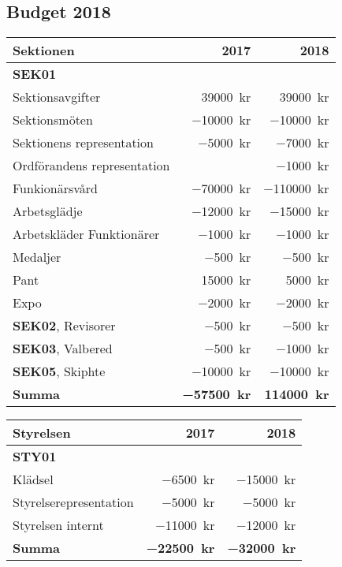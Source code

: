\documentclass[../_main/handlingar.tex]{subfiles}
\begin{document}
\subsection*{Budget 2018}
\begin{tabularx}{10cm}{X r r}
    \textbf{\large Sektionen} & \textbf{2017} & \textbf{2018} \\
    \hline
    \textbf{SEK01} \\
    Sektionsavgifter & \SI{39000}{kr} & \SI{39000}{kr} \\
    Sektionsmöten & \SI{-10000}{kr} & \SI{-10000}{kr} \\
    Sektionens representation & \SI{-5000}{kr} & \SI{-7000}{kr} \\
    Ordförandens representation & & \SI{-1000}{kr} \\
    Funkionärsvård & \SI{-70000}{kr} & \SI{-110000}{kr} \\
    Arbetsglädje & \SI{-12000}{kr} & \SI{-15000}{kr} \\
    Arbetskläder Funktionärer & \SI{-1000}{kr} & \SI{-1000}{kr} \\
    Medaljer & \SI{-500}{kr} & \SI{-500}{kr} \\
    Pant & \SI{15000}{kr} & \SI{5000}{kr} \\
    Expo & \SI{-2000}{kr} & \SI{-2000}{kr} \\
    \textbf{SEK02}, Revisorer & \SI{-500}{kr} & \SI{-500}{kr} \\
    \textbf{SEK03}, Valbered & \SI{-500}{kr} & \SI{-1000}{kr} \\
    \textbf{SEK05}, Skiphte & \SI{-10000}{kr} & \SI{-10000}{kr} \\
    \hline
    \textbf{Summa} & \textbf{\SI{-57500}{kr}} & \textbf{\SI{114000}{kr}} \\
\end{tabularx}

\begin{tabularx}{10cm}{X r r}
    \textbf{\large Styrelsen} & \textbf{2017} & \textbf{2018} \\
    \hline
    \textbf{STY01} \\
    Klädsel & \SI{-6500}{kr} & \SI{-15000}{kr} \\
    Styrelserepresentation & \SI{-5000}{kr} & \SI{-5000}{kr} \\
    Styrelsen internt & \SI{-11000}{kr} & \SI{-12000}{kr} \\
    \hline
    \textbf{Summa} & \textbf{\SI{-22500}{kr}} & \textbf{\SI{-32000}{kr}} \\
\end{tabularx}
\end{document}
